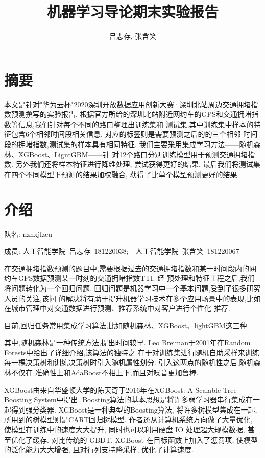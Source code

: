 \documentclass[a4paper,UTF8]{article}
\begin{document}
	\title{机器学习导论期末实验报告}
	\author{吕志存, 张含笑}
  \maketitle
  
\section{摘要}
本文是针对"华为云杯"2020深圳开放数据应用创新大赛·深圳北站周边交通拥堵指数预测撰写的实验报告. 
根据官方所给的深圳北站附近网约车的GPS和交通拥堵指数等信息,我们针对每个不同的路口整理出训练集和
测试集,其中训练集中样本的特征包含6个相邻时间段相关信息, 对应的标签则是需要预测之后的的三个相邻
时间段的拥堵指数,测试集的样本具有相同特征. 我们主要采用集成学习方法——随机森林、XGBoost、LigntGBM——针
对12个路口分别训练模型用于预测交通拥堵指数. 另外我们还将样本特征进行降维处理, 尝试获得更好的结果. 最后我们将测试集在四个不同模型下预测的结果加权融合, 获得了比单个模型预测更好的结果. 

\section{介绍}
队名: nzhxjlzcu

成员:
	人工智能学院\ 吕志存\ 181220038;\ \ 人工智能学院\ 张含笑\ 181220067

在交通拥堵指数预测的题目中,需要根据过去的交通拥堵指数和某一时间段内的网约车GPS数据预测某一时刻的交通拥堵指数TTI. 经
预处理和特征工程之后,我们将问题转化为一个回归问题. 回归问题是机器学习中一个基本问题,受到了很多研究人员的关注,该问
的解决将有助于提升机器学习技术在多个应用场景中的表现,比如在城市管理中对交通数据进行预测、推荐系统中对客户进行个性化
推荐. 

目前,回归任务常用集成学习算法,比如随机森林、XGBoost、lightGBM这三种.  

其中,随机森林是一种传统方法,提出时间较早. Leo Breiman于2001年在Random Forests中给出了详细介绍\cite{ref1},该算法的独特之
在于对训练集进行随机自助采样来训练每一棵决策树和训练决策树时引入随机属性划分. 引入这两点的随机性之后,随机森林不仅在
准确性上和AdaBoost不相上下,而且对噪音更加鲁棒.  

XGBoost由来自华盛顿大学的陈天奇于2016年在XGBoost: A Scalable Tree Boosting System中提出\cite{ref2}. 
Boosting算法的基本思想是将许多弱学习器串行集成在一起得到强分类器. XGBoost是一种典型的Boosting算法, 
将许多树模型集成在一起, 所用到的树模型则是CART回归树模型. 
作者还从计算机系统方向做了大量优化, 使模型在训练中的速度大大提升, 同时也可以利用硬盘 IO 处理超大规模数据, 甚至优化了缓存. 
对比传统的 GBDT, XGBoost 在目标函数上加入了惩罚项, 使模型的泛化能力大大增强, 且对行列支持降采样, 优化了计算速度. 
\end{document}
